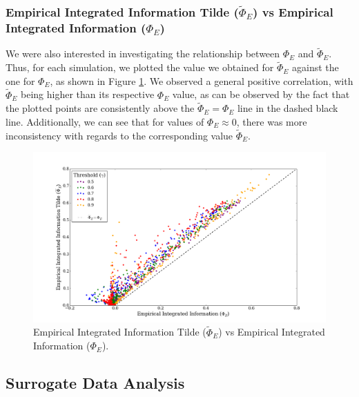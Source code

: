 \documentclass[a4paper,11pt]{article}
\begin{document}
\subsubsection{Empirical Integrated Information Tilde ($\widetilde{\Phi}_{E}$) vs Empirical Integrated Information ($\Phi_{E}$)}

We were also interested in investigating the relationship between $\Phi_{E}$ and $\widetilde{\Phi}_{E}$. Thus, for each simulation, we plotted the value we obtained for $\widetilde{\Phi}_{E}$ against the one for $\Phi_E$, as shown in Figure \ref{fig:phi-tilde-vs-phi}. We observed a general positive correlation, with $\widetilde{\Phi}_{E}$ being higher than its respective $\Phi_E$ value, as can be observed by the fact that the plotted points are consistently above the $\widetilde{\Phi}_{E} = \Phi_E$ line in the dashed black line. Additionally, we can see that for values of $\Phi_E \approx 0$, there was more inconsistency with regards to the corresponding value $\widetilde{\Phi}_{E}$.

\begin{figure}[H]
\begin{center}
\includegraphics[scale = 0.35]{figures/phi_tilde_vs_phi}
\caption{
	Empirical Integrated Information Tilde ($\widetilde{\Phi}_E$) vs Empirical Integrated Information ($\Phi_E$).
	\label{fig:phi-tilde-vs-phi}
}
\end{center}
\end{figure}

\subsection{Surrogate Data Analysis}
\label{sec:app:osc:surrogate}
\end{document}
